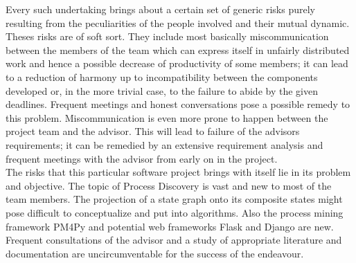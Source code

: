 \documentclass[12pt]{extarticle}
\begin{document}
Every such undertaking brings about a certain set of generic risks purely resulting from the peculiarities of the people involved and their mutual dynamic. Theses risks are of soft sort. They include most basically miscommunication between the members of the team which can express itself in unfairly distributed work and hence a possible decrease of productivity of some members; it can lead to a reduction of harmony up to incompatibility between the components developed or, in the more trivial case, to the failure to abide by the given deadlines. Frequent meetings and honest conversations pose a possible remedy to this problem. Miscommunication is even more prone to happen between the project team and the advisor. This will lead to failure of the advisors requirements; it can be remedied by an extensive requirement analysis and frequent meetings with the advisor from early on in the project.\\
The risks that this particular software project brings with itself lie in its problem and objective. The topic of Process Discovery is vast and new to most of the team members. The projection of a state graph onto its composite states might pose difficult to conceptualize and put into algorithms. Also the process mining framework PM4Py and potential web frameworks Flask and Django are new. Frequent consultations of the advisor and a study of appropriate literature and documentation are uncircumventable for the success of the endeavour.

\printbibliography
\end{document}
